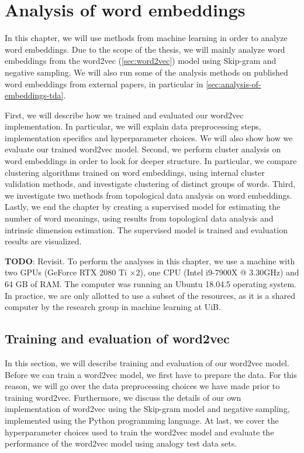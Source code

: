 \chapter{Analysis of word embeddings}
In this chapter, we will use methods from machine learning in order to analyze word embeddings. Due to the scope of the thesis, we will mainly analyze word embeddings from the word2vec (\cref{sec:word2vec}) model using Skip-gram and negative sampling. We will also run some of the analysis methods on published word embeddings from external papers, in particular in \cref{sec:analysis-of-embeddings-tda}.

First, we will describe how we trained and evaluated our word2vec implementation. In particular, we will explain data preprocessing steps, implementation specifics and hyperparameter choices. We will also show how we evaluate our trained word2vec model. Second, we perform cluster analysis on word embeddings in order to look for deeper structure. In particular, we compare clustering algorithms trained on word embeddings, using internal cluster validation methods, and investigate clustering of distinct groups of words. Third, we investigate two methods from topological data analysis on word embeddings. Lastly, we end the chapter by creating a supervised model for estimating the number of word meanings, using results from topological data analysis and intrinsic dimension estimation. The supervised model is trained and evaluation results are visualized.

\textbf{TODO}: Revisit.
To perform the analyses in this chapter, we use a machine with two GPUs (GeForce RTX 2080 Ti $\times2$), one CPU (Intel i9-7900X @ 3.30GHz) and 64 GB of RAM. The computer was running an Ubuntu 18.04.5 operating system. In practice, we are only allotted to use a subset of the resources, as it is a shared computer by the research group in machine learning at UiB.

\section{Training and evaluation of word2vec}
\label{sec:training-and-eval-our-word2vec-impl}
In this section, we will describe training and evaluation of our word2vec model. Before we can train a word2vec model, we first have to prepare the data. For this reason, we will go over the data preprocessing choices we have made prior to training word2vec. Furthermore, we discuss the details of our own implementation of word2vec using the Skip-gram model and negative sampling, implemented using the Python programming language. At last, we cover the hyperparameter choices used to train the word2vec model and evaluate the performance of the word2vec model using analogy test data sets.

